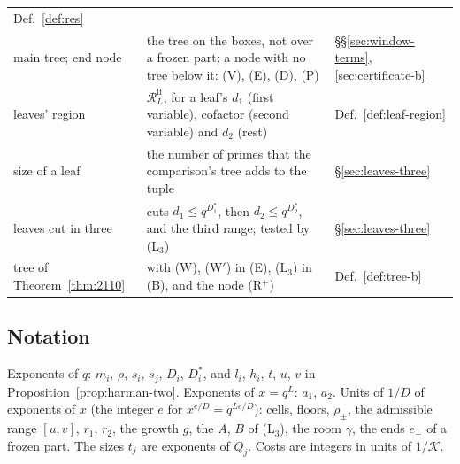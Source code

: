 \documentclass[11pt]{article}
\theoremstyle{definition}
\begin{document}
{\begin{longtable}{@{}>{\raggedright\arraybackslash}p{}
  >{\raggedright\arraybackslash}p{}
  >{\raggedright\arraybackslash}p{}@{}}
  Def.~\ref{def:res} \\
main tree; end node & the tree on the boxes, not over a frozen part; a node with no tree below it: (V), (E), (D), (P)
  & \S\S\ref{sec:window-terms}, \ref{sec:certificate-b} \\
leaves' region & $\mathcal R^{\mathrm{lf}}_L$, for a leaf's $d_1$ (first variable), cofactor (second variable) and
  $d_2$ (rest) &
  Def.~\ref{def:leaf-region} \\
size of a leaf & the number of primes that the comparison's tree adds to the tuple & \S\ref{sec:leaves-three} \\
leaves cut in three & cuts $d_1 \le q^{D_1^*}$, then $d_2 \le q^{D_2^*}$, and the third range; tested by
  (L$_3$) & \S\ref{sec:leaves-three} \\
tree of Theorem~\ref{thm:2110} & with (W), (W$'$) in (E), (L$_3$) in (B), and the node (R$^+$) &
  Def.~\ref{def:tree-b} \\
\bottomrule
\end{longtable}
}

\subsection*{Notation}

Exponents of $q$: $m_i$, $\rho$, $s_i$, $s_j$, $D_i$, $D_i^*$, and $l_i$, $h_i$, $t$, $u$, $v$ in
Proposition~\ref{prop:harman-two}. Exponents of $x = q^L$: $a_1$, $a_2$. Units of $1/D$ of exponents of $x$ (the
integer $e$ for $x^{e/D} = q^{Le/D}$): cells, floors, $\rho_\pm$, the admissible range $[u, v]$, $r_1$, $r_2$, the
growth $g$, the $A$, $B$ of (L$_3$), the room $\gamma$, the ends $e_\pm$ of a frozen part. The sizes $t_j$ are
exponents of $Q_j$. Costs are integers in units of $1/\mathcal K$.
\end{document}
